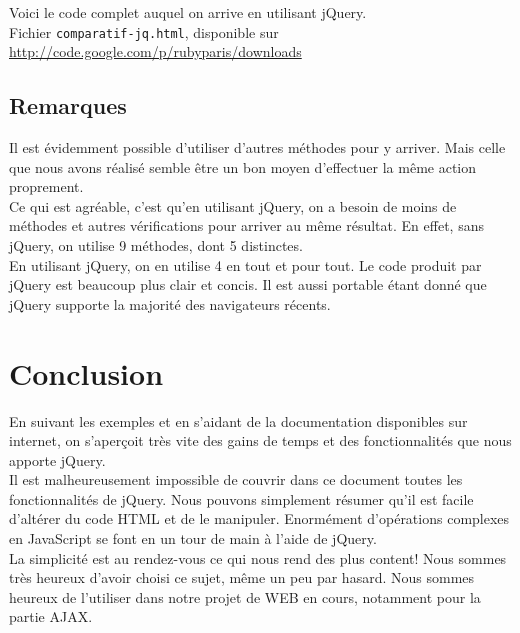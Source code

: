\documentclass[10pt,a4paper,titlepage]{article}
\begin{document}
Voici le code complet auquel on arrive en utilisant jQuery. \\

Fichier \texttt{comparatif-jq.html}, disponible sur \url{http://code.google.com/p/rubyparis/downloads}



\subsection{Remarques}

Il est évidemment possible d'utiliser d'autres méthodes pour y arriver. Mais celle que nous avons réalisé semble être un bon moyen d'effectuer la même action proprement.  \\

Ce qui est agréable, c'est qu'en utilisant jQuery, on a besoin de moins de méthodes et autres vérifications pour arriver au même résultat. En effet, sans jQuery, on utilise 9 méthodes, dont 5 distinctes. \\

En utilisant jQuery, on en utilise 4 en tout et pour tout. Le code produit par jQuery est beaucoup plus clair et concis. Il est aussi portable étant donné que jQuery supporte la majorité des navigateurs récents.

\newpage
\section{Conclusion}


En suivant les exemples et en s'aidant de la documentation disponibles sur internet, on s'aperçoit très vite des gains de temps et des fonctionnalités que nous apporte jQuery. \\

Il est malheureusement impossible de couvrir dans ce document toutes les fonctionnalités de jQuery. Nous pouvons simplement résumer qu'il est facile d'altérer du code HTML et de le manipuler. Enormément d'opérations complexes en JavaScript se font en un tour de main à l'aide de jQuery. \\

La simplicité est au rendez-vous ce qui nous rend des plus content! Nous sommes très heureux d'avoir choisi ce sujet, même un peu par hasard. Nous sommes heureux de l'utiliser dans notre projet de WEB en cours, notamment pour la partie AJAX.

\newpage
\end{document}

